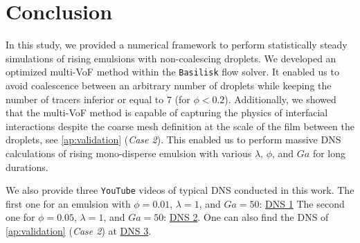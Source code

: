 \section{Conclusion}


In this study, we provided a numerical framework to perform statistically steady simulations of rising emulsions with non-coalescing droplets. 
We developed an optimized multi-VoF method within the \texttt{Basilisk} flow solver. 
It enabled us to avoid coalescence between an arbitrary number of droplets while keeping the number of tracers inferior or equal to $7$ (for $\phi < 0.2$). 
Additionally, we showed that the multi-VoF method is capable of capturing the physics of interfacial interactions despite the coarse mesh definition at the scale of the film between the droplets, see \ref{ap:validation} (\textit{Case 2}). 
This enabled us to perform massive DNS calculations of rising mono-disperse emulsion with various $\lambda$, $\phi$, and $Ga$ for long durations.

We also provide three \texttt{YouTube} videos of typical DNS conducted in this work. 
The first one for an emulsion with $\phi = 0.01$, $\lambda = 1$, and $Ga = 50$: \href{https://youtube.com/shorts/R44HSADSUCc}{DNS 1}
The second one for $\phi=0.05$, $\lambda = 1$, and $Ga = 50$: \href{https://youtube.com/shorts/bGNlK2MV7p0}{DNS 2}. 
One can also find the DNS of \ref{ap:validation} (\textit{Case 2}) at \href{https://youtube.com/shorts/GhNfOf-Vbwo}{DNS 3}. 
